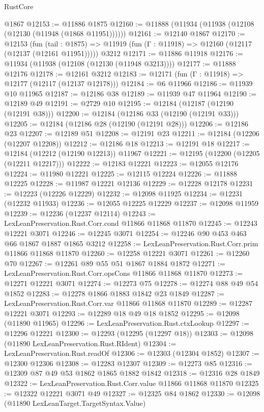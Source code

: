 \begin{lexlean}{RustCore}
\begin{coremodule}
    @1867
@12153 := @11886 @1875
@12160 := @11888 (@11934 (@11938 (@12108 (@12130 (@11948 (@1868 @11951))))))
@12161 := @12140 @1867
@12170 := @12153
    (fun (tail : @1875) => @11919 (fun (Γ : @11918) => @12160 (@12117 (@12137 (@12161 @11951)))))
    @3212
@12171 := @11886 @11918
@12176 := @11934 (@11938 (@12108 (@12130 (@11948 @3213))))
@12177 := @11888 @12176
@12178 := @12161 @3212
@12183 := @12171 (fun (Γ : @11918) => @12177 (@12117 (@12137 @12178)))
@12184 := @6 @11966
@12186 := @11939 @10 @11965
@12187 := @12186 @38
@12189 := @11939 @47 @11964
@12190 := @12189 @49
@12191 := @2729 @10
@12195 := @12184 (@12187 (@12190 (@12191 @38)))
@12200 := @12184 (@12186 @33 (@12190 (@12191 @33)))
@12205 := @12184 (@12186 @28 (@12190 (@12191 @28)))
@12206 := @12186 @23
@12207 := @12189 @51
@12208 := @12191 @23
@12211 := @12184 (@12206 (@12207 @12208))
@12212 := @12186 @18
@12213 := @12191 @18
@12217 := @12184 (@12212 (@12190 @12213)) @11967
@12221 := @12195 (@12200 (@12205 (@12211 @12217)))
@12222 := @12183 @12221
@12223 := @12055 @12176
@12224 := @11980 @12221
@12225 := @12115 @12224
@12226 := @11888 @12225
@12228 := @11987 @12221 @12136
@12229 := @12228 @12178
@12231 := @12223 (@12226 @12229)
@12232 := @12098 @11925
@12234 := @12231 (@12232 @11933)
@12236 := @12055 @12225 @12229
@12237 := @12098 @11959
@12239 := @12236 (@12237 @12114)
@12243 := LexLeanPreservation.Rust.Corr.cond @11866 @11868 @11870
@12245 := @12243 @12221 @3071
@12246 := @12245 @3071
@12254 := @12246 @90 @453 @463 @66 @1867 @1887 @1865 @3212
@12258 := LexLeanPreservation.Rust.Corr.prim @11866 @11868 @11870
@12260 := @12258 @12221 @3071
@12261 := @12260 @70
@12267 := @12261 @89 @55 @51 @1867 @1884 @1872
@12271 := LexLeanPreservation.Rust.Corr.opsCons @11866 @11868 @11870
@12273 := @12271 @12221 @3071
@12274 := @12273 @75
@12278 := @12274 @88 @49 @54 @1852
@12283 := @12278 @1866 @1883 @1842 @23 @1849
@12287 := LexLeanPreservation.Rust.Corr.var @11866 @11868 @11870
@12289 := @12287 @12221 @3071
@12293 := @12289 @18 @49 @18 @1852
@12295 := @12098 (@11890 @11965)
@12296 := LexLeanPreservation.Rust.ctxLookup
@12297 := @12296 @12221
@12300 := @12293 (@12295 (@12297 @18))
@12303 := @12098 (@11890 LexLeanPreservation.Rust.RIdent)
@12304 := LexLeanPreservation.Rust.readOf
@12306 := @12303 (@12304 @1852)
@12307 := @12300 @12306
@12308 := @12283 @12307
@12309 := @12273 @85
@12316 := @12309 @87 @49 @53 @1862 @1865 @1882 @1842
@12318 := @12316 @28 @1849
@12322 := LexLeanPreservation.Rust.Corr.value @11866 @11868 @11870
@12325 := @12322 @12221 @3071 @49
@12327 := @12325 @84 @1862
@12330 := @12098 (@11890 LexLeanTarget.TargetSyntax.Value)

\end{coremodule}
\end{lexlean}
